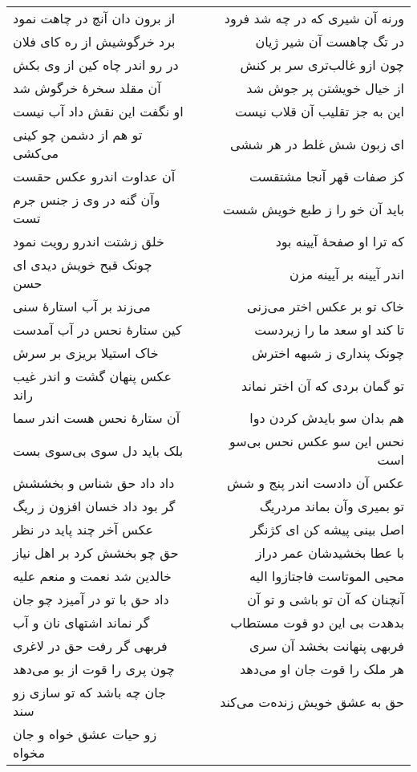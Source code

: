 \begin{center}
\begin{longtable}{l p{0.5cm} r}
از برون دان آنچ در چاهت نمود
&&
ورنه آن شیری که در چه شد فرود
\\
برد خرگوشیش از ره کای فلان
&&
در تگ چاهست آن شیر ژیان
\\
در رو اندر چاه کین از وی بکش
&&
چون ازو غالب‌تری سر بر کنش
\\
آن مقلد سخرهٔ خرگوش شد
&&
از خیال خویشتن پر جوش شد
\\
او نگفت این نقش داد آب نیست
&&
این به جز تقلیب آن قلاب نیست
\\
تو هم از دشمن چو کینی می‌کشی
&&
ای زبون شش غلط در هر ششی
\\
آن عداوت اندرو عکس حقست
&&
کز صفات قهر آنجا مشتقست
\\
وآن گنه در وی ز جنس جرم تست
&&
باید آن خو را ز طبع خویش شست
\\
خلق زشتت اندرو رویت نمود
&&
که ترا او صفحهٔ آیینه بود
\\
چونک قبح خویش دیدی ای حسن
&&
اندر آیینه بر آیینه مزن
\\
می‌زند بر آب استارهٔ سنی
&&
خاک تو بر عکس اختر می‌زنی
\\
کین ستارهٔ نحس در آب آمدست
&&
تا کند او سعد ما را زیردست
\\
خاک استیلا بریزی بر سرش
&&
چونک پنداری ز شبهه اخترش
\\
عکس پنهان گشت و اندر غیب راند
&&
تو گمان بردی که آن اختر نماند
\\
آن ستارهٔ نحس هست اندر سما
&&
هم بدان سو بایدش کردن دوا
\\
بلک باید دل سوی بی‌سوی بست
&&
نحس این سو عکس نحس بی‌سو است
\\
داد داد حق شناس و بخششش
&&
عکس آن دادست اندر پنج و شش
\\
گر بود داد خسان افزون ز ریگ
&&
تو بمیری وآن بماند مردریگ
\\
عکس آخر چند پاید در نظر
&&
اصل بینی پیشه کن ای کژنگر
\\
حق چو بخشش کرد بر اهل نیاز
&&
با عطا بخشیدشان عمر دراز
\\
خالدین شد نعمت و منعم علیه
&&
محیی الموتاست فاجتازوا الیه
\\
داد حق با تو در آمیزد چو جان
&&
آنچنان که آن تو باشی و تو آن
\\
گر نماند اشتهای نان و آب
&&
بدهدت بی این دو قوت مستطاب
\\
فربهی گر رفت حق در لاغری
&&
فربهی پنهانت بخشد آن سری
\\
چون پری را قوت از بو می‌دهد
&&
هر ملک را قوت جان او می‌دهد
\\
جان چه باشد که تو سازی زو سند
&&
حق به عشق خویش زنده‌ت می‌کند
\\
زو حیات عشق خواه و جان مخواه

\end{longtable}
\end{center}
